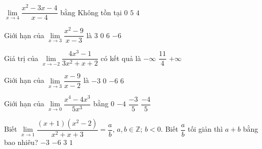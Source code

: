 \begin{ex}%
	$\lim\limits_{x\to  4}\dfrac{x^2-3x-4}{x-4}$ bằng
	 \choice
		{Không tồn  tại}
		{$0$} 
		 {\True $5$}
		{$4$} 
\end{ex}

\begin{ex}%
	Giới hạn  của $\displaystyle\lim\limits_{x \rightarrow 3} \dfrac{x^2-9}{x-3}$ là
	\choice 
		 {$3$}
		 {$0$}
		 {\True $6$}
		{$-6$} 
\end{ex}

\begin{ex}%
	Giá  trị của $\lim\limits_{x\to -2}\dfrac{4x^3 -1}{3x^2 +x +2}$ có kết quả là
		{$-\infty  $}
		{$\dfrac{11}{4} $} 
		{ $ +\infty $} 
\end{ex}

\begin{ex}%
	Giới hạn  của $\displaystyle\lim\limits_{x \rightarrow 3} \dfrac{x-9}{x-2}$ là
	\choice 
		{$-3$} 
		{$0$} 
		 {\True $-6$}
		{$6$} 
\end{ex}

\begin{ex}%
	Giới hạn của $\lim\limits_{x  \to 0} \dfrac{x^4-4x^3}{5x^3}$ bằng
	\choice 
		{$0$} 
		 {$-4$}
		{$\dfrac{-3}{5}$} 
		{\True $\dfrac{-4}{5}$} 
\end{ex}

\begin{ex}%
	Biết $\lim\limits_{x\to 1}\dfrac{(x+1)(x^2-2)}{x^2+x+3}=\dfrac{a}{b}$,  $a, b\in \mathbb{Z}$; $b<0$. Biết $\dfrac{a}{b}$ tối giản thì $a+b$ bằng bao nhiêu?
	\choice 
		{\True $-3$} 
		{$-6$} 
		 {$3$}
		 {$1$}
\end{ex}

